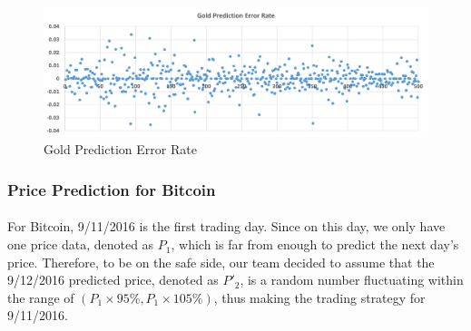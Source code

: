 \documentclass[12pt]{article}
\begin{document}
\begin{figure}[htp]
    \centering
    \includegraphics[width=0.8\linewidth]{figures/fig6}  
    \caption{Gold Prediction Error Rate}
    \label{fig5:2}
\end{figure}

\subsubsection{Price Prediction for Bitcoin}
\paragraph{}
For Bitcoin, 9/11/2016 is the first trading day. Since on this day, we only have one price data, denoted as $P_1$, which is far from enough to predict the next day's price. Therefore, to be on the safe side, our team decided to assume that the 9/12/2016 predicted price, denoted as $P'_2$, is a random number fluctuating within the range of $(P_1\times95\%, P_1\times105\%)$, thus making the trading strategy for 9/11/2016.
\end{document}
